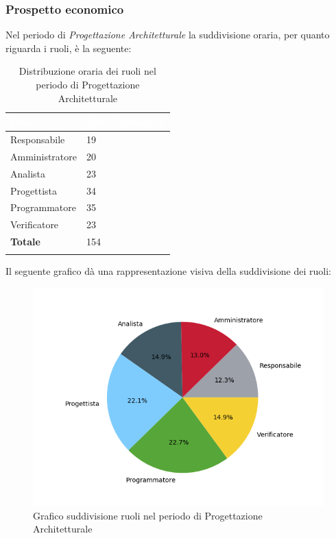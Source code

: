 \subsubsection{Prospetto economico}
Nel periodo di \textit{Progettazione Architetturale} la suddivisione oraria, per quanto riguarda i ruoli, è la seguente: 


\begin{longtable}{| C{.30\textwidth}| C{.15\textwidth}| C{.20\textwidth}|}
\hline
{}\textbf{\textcolor{white}{Ruolo}} & \textbf{\textcolor{white}{Ore}} & \textbf{\textcolor{white}{Costo in \euro}} \\
\hline 
Responsabile & 19 &  \\
\hline
{}Amministratore & 20 & \\
\hline
Analista & 23 &  \\
\hline
{}Progettista & 34 &  \\
\hline
Programmatore & 35 &  \\
\hline
{}Verificatore & 23 &  \\
\hline
\textbf{Totale} & 154 & \\ 
\hline

\caption{Distribuzione oraria dei ruoli nel periodo di Progettazione Architetturale}
\label{Distribuzione oraria del periodo di pa}
\end{longtable}

Il seguente grafico dà una rappresentazione visiva della suddivisione dei ruoli:
\begin{figure}[H]
	\centering
  		\includegraphics[width=1\linewidth]{./images/torta_pa.png}
  		\caption{Grafico suddivisione ruoli nel periodo di Progettazione Architetturale}
  		\label{fig:grafico suddivione ruoli pa}
\end{figure}



